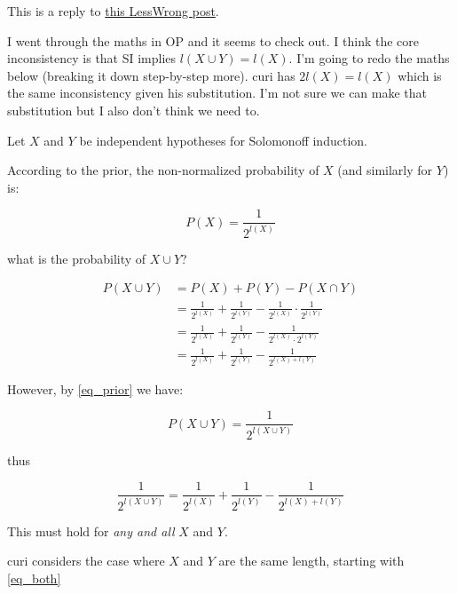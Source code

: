 \documentclass{article}
\begin{document}
This is a reply to \href{https://www.lesswrong.com/posts/hD4boFF6K782grtqX/mathematical-inconsistency-in-solomonoff-induction}{this LessWrong post}.

I went through the maths in OP and it seems to check out. I think the core inconsistency is that SI implies \(l(X \cup Y) = l(X)\). I'm going to redo the maths below (breaking it down step-by-step more). curi has \(2l(X) = l(X)\) which is the same inconsistency given his substitution. I'm not sure we can make that substitution but I also don't think we need to.

Let $X$ and $Y$ be independent hypotheses for Solomonoff induction.

According to the prior, the non-normalized probability of $X$ (and similarly for $Y$) is:


\begin{equation} \label{eq_prior}
P(X) = \frac{1}{2^{l(X)}}
\end{equation}

what is the probability of \(X\cup Y\)?

\begin{equation} \label{eq_std_prob}
\begin{split}
P(X\cup Y) & = P(X) + P(Y) - P(X\cap Y) \\
& = \frac{1}{2^{l(X)}} + \frac{1}{2^{l(Y)}} - \frac{1}{2^{l(X)}} \cdot \frac{1}{2^{l(Y)}} \\
& = \frac{1}{2^{l(X)}} + \frac{1}{2^{l(Y)}} - \frac{1}{2^{l(X)} \cdot 2^{l(Y)}} \\
& = \frac{1}{2^{l(X)}} + \frac{1}{2^{l(Y)}} - \frac{1}{2^{l(X) + l(Y)}}
\end{split}
\end{equation}

However, by \cref{eq_prior} we have:

\begin{equation} \label{eq_or}
P(X\cup Y) = \frac{1}{2^{l(X\cup Y)}}
\end{equation}

thus

\begin{equation} \label{eq_both}
\frac{1}{2^{l(X\cup Y)}} = \frac{1}{2^{l(X)}} + \frac{1}{2^{l(Y)}} - \frac{1}{2^{l(X) + l(Y)}}
\end{equation}

This must hold for \emph{any and all} $X$ and $Y$.

curi considers the case where $X$ and $Y$ are the same length, starting with \cref{eq_both}
\end{document}
